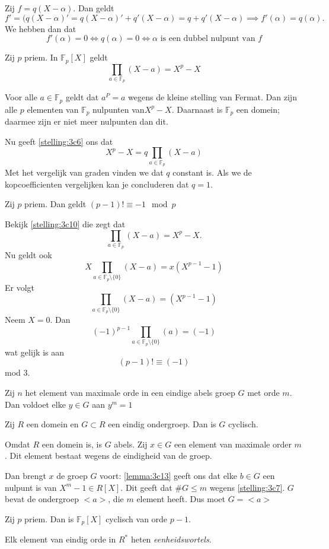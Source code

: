 \documentclass[a4paper,12pt,oneside]{book}
\begin{document}
\begin{bewijs}
Zij $f  = q(X-\alpha)$. Dan geldt
\[
f' = (q(X-\alpha)' = q(X-\alpha)' + q'(X-\alpha) = q + q'(X-\alpha) \implies f'(\alpha) = q(\alpha).
\]
We hebben dan dat
\[
f'(\alpha) = 0 \iff q(\alpha) = 0 \iff \alpha \text{ is een dubbel nulpunt van $f$}
\]
\end{bewijs}
\begin{stelling}
\label{stelling:3c10}
Zij $p$ priem. In $\mathbb{F}_p[X]$ geldt
\[
\prod_{a\in \mathbb{F}_p} (X-a) = X^p -X
\]
\end{stelling}
\begin{bewijs}
Voor alle $a \in \mathbb{F}_p$ geldt dat $a^P = a$ wegens de kleine stelling van Fermat. Dan zijn alle $p$ elementen van $\mathbb{F}_p$ nulpunten van$X^p-X$. Daarnaast is $\mathbb{F}_p$ een domein; daarmee zijn er niet meer nulpunten dan dit.

Nu geeft \autoref{stelling:3c6} ons dat 
\[
X^p -X = q \prod_{a\in \mathbb{F}_p} (X-a) 
\]
Met het vergelijk van graden vinden we dat $q$ constant is. Als we de kopcoefficienten vergelijken kan je concluderen dat $q=1$.
\end{bewijs}
\begin{gevolg}
Zij $p$ priem. Dan geldt $(p-1)! \equiv -1 \mod p$
\end{gevolg}
\begin{bewijs}
Bekijk \autoref{stelling:3c10} die zegt  dat
\[
\prod_{a\in \mathbb{F}_p} (X-a) = X^p -X.
\]
Nu geldt ook
\[
X\prod_{a\in \mathbb{F}_p \setminus \{0\}} (X-a) = x(X^{p-1} -1)
\]
Er volgt
\[
\prod_{a\in \mathbb{F}_p \setminus \{0\}} (X-a) = (X^{p-1} -1)
\]
Neem $X=0$. Dan
\[
(-1)^{p-1} \prod_{a\in \mathbb{F}_p \setminus \{0\}} (a) = (-1)
\]
wat gelijk is aan
\[
(p-1)! \equiv (-1)
\]
mod 3.
\end{bewijs}

\begin{lemma}
\label{lemma:3c13}
Zij $n$ het element van maximale orde in een eindige abels groep $G$ met orde $m$. Dan voldoet elke $y \in G$ aan $y^m = 1$ 
\end{lemma}

\begin{stelling}
Zij $R$ een domein en $G\subset R $ een eindig ondergroep. Dan is $G$ cyclisch.
\end{stelling}
\begin{bewijs}
Omdat $R$ een domein is, is $G$ abels. Zij $x \in G$ een element van maximale order $m$. Dit element bestaat wegens de eindigheid van de groep. 

Dan brengt $x$ de groep $G$ voort: \autoref{lemma:3c13} geeft ons dat elke $b \in G$ een nulpunt is van $X^m -1 \in R[X]$. Dit geeft dat $\#G \le m$ wegens \autoref{stelling:3c7}. $G$ bevat de ondergroep $<a>$, die $m$ element heeft. Dus moet $G = <a>$
\end{bewijs}
\begin{gevolg}
Zij $p$ priem. Dan is $\mathbb{F}_p[X]$ cyclisch van orde $p-1$.
\end{gevolg}

\begin{definitie}
Elk element van eindig orde in $R^*$ heten \textit{eenheidswortels}.
\end{definitie}
\end{document}
